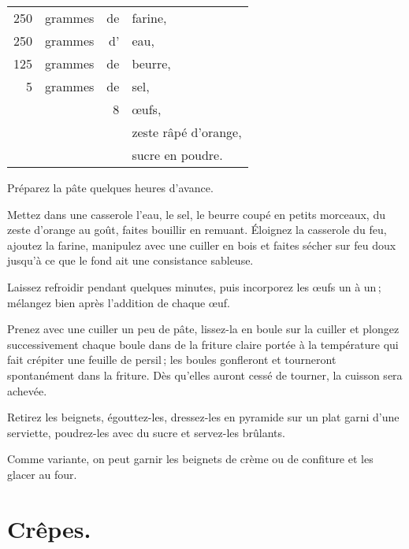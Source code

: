 \footnotesize
\begin{longtable}{rrrp{16em}}
    250 & grammes & de & farine,                                                                          \\
    250 & grammes & d' & eau,                                                                             \\
    125 & grammes & de & beurre,                                                                          \\
      5 & grammes & de & sel,                                                                             \\
        &         &  8 & œufs,                                                                            \\
        &         &    & zeste râpé d'orange,                                                             \\
        &         &    & sucre en poudre.                                                                 \\
\end{longtable}
\normalsize

Préparez la pâte quelques heures d'avance.

Mettez dans une casserole l’eau, le sel, le beurre coupé en petits morceaux, du
zeste d'orange au goût, faites bouillir en remuant. Éloignez la casserole du feu,
ajoutez la farine, manipulez avec une cuiller en bois et faites sécher sur feu doux
jusqu'à ce que le fond ait une consistance sableuse.

Laissez refroidir pendant quelques minutes, puis incorporez les œufs un à un ;
mélangez bien après l'addition de chaque œuf.

Prenez avec une cuiller un peu de pâte, lissez-la en boule sur la cuiller et
plongez successivement chaque boule dans de la friture claire portée à la
température qui fait crépiter une feuille de persil ; les boules gonfleront et
tourneront spontanément dans la friture. Dès qu'elles auront cessé de tourner,
la cuisson sera achevée.

Retirez les beignets, égouttez-les, dressez-les en pyramide sur un plat garni
d'une serviette, poudrez-les avec du sucre et servez-les brûlants.

\sk

Comme variante, on peut garnir les beignets de crème ou de confiture et les
glacer au four.

\section*{\centering Crêpes.}
{}

